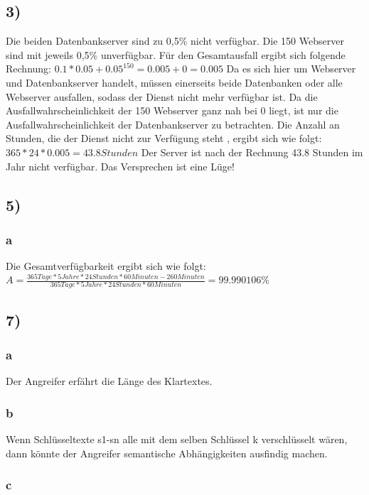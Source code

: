 \documentclass[ngerman]{fbi-aufgabenblatt}
\begin{document}
	\setcounter{section}{0}


	\subsection*{3)}
  Die beiden Datenbankserver sind zu 0,5\% nicht verfügbar. Die 150 Webserver
	sind mit jeweils 0,5\% unverfügbar.
	Für den Gesamtausfall ergibt sich folgende Rechnung: \newline
	$0.1* 0.05 + {0.05}^{150} = 0.005 + 0 = 0.005$ \newline
	Da es sich hier um Webserver und Datenbankserver handelt, müssen einerseits
	beide Datenbanken
	oder alle Webserver ausfallen, sodass der Dienst nicht mehr verfügbar ist.
	Da die Ausfallwahrscheinlichkeit der 150 Webserver ganz nah bei 0 liegt, ist
	nur die Ausfallwahrscheinlichkeit der Datenbankserver zu betrachten.
	\newline
	Die Anzahl an Stunden, die der Dienst nicht zur Verfügung steht , ergibt sich wie folgt: \newline
	$365 * 24 * 0.005 = 43.8 Stunden$ \newline
	Der Server ist nach der Rechnung 43.8 Stunden im Jahr nicht verfügbar.
	Das Versprechen ist eine Lüge!
	
	\subsection*{5)}

  \subsubsection*{a}
  Die Gesamtverfügbarkeit ergibt sich wie folgt: \newline
  \newline
  $A = \frac{365 Tage * 5 Jahre * 24 Stunden * 60 Minuten - 260 Minuten}{365 Tage * 5
  Jahre * 24 Stunden * 60 Minuten}= 99.990106 \%$
  

	
	\subsection*{7)}
  \subsubsection*{a}
  Der Angreifer erfährt die Länge des Klartextes.
    \subsubsection*{b}
  Wenn Schlüsseltexte s1-sn alle mit dem selben Schlüssel k verschlüsselt wären, dann könnte der Angreifer semantische Abhängigkeiten ausfindig machen.
      \subsubsection*{c}
\end{document}
